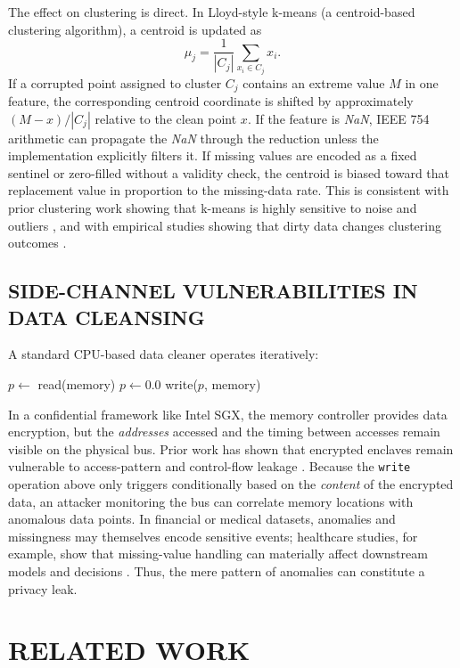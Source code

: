 \documentclass[conference]{IEEEtran}
\begin{document}
The effect on clustering is direct. In Lloyd-style k-means (a centroid-based clustering algorithm), a centroid is updated as
\begin{equation}
\mu_j = \frac{1}{|C_j|}\sum_{x_i \in C_j} x_i .
\end{equation}
If a corrupted point assigned to cluster $C_j$ contains an extreme value $M$ in one feature, the corresponding centroid coordinate is shifted by approximately $(M-x)/|C_j|$ relative to the clean point $x$. If the feature is \textit{NaN}, IEEE 754 arithmetic can propagate the \textit{NaN} through the reduction unless the implementation explicitly filters it. If missing values are encoded as a fixed sentinel or zero-filled without a validity check, the centroid is biased toward that replacement value in proportion to the missing-data rate. This is consistent with prior clustering work showing that k-means is highly sensitive to noise and outliers \cite{Chawla:2013,Im:2020}, and with empirical studies showing that dirty data changes clustering outcomes \cite{Qi:2021}.

\subsection{SIDE-CHANNEL VULNERABILITIES IN DATA CLEANSING}
A standard CPU-based data cleaner operates iteratively:
\begin{algorithmic}
\STATE $p \gets$ read(memory)
    \STATE $p \gets 0.0$
    \STATE write($p$, memory)
\ENDIF
\end{algorithmic}

In a confidential framework like Intel SGX, the memory controller provides data encryption, but the \textit{addresses} accessed and the timing between accesses remain visible on the physical bus. Prior work has shown that encrypted enclaves remain vulnerable to access-pattern and control-flow leakage \cite{Xu:2015,Gruss:2016,Lee:2017}. Because the \texttt{write} operation above only triggers conditionally based on the \textit{content} of the encrypted data, an attacker monitoring the bus can correlate memory locations with anomalous data points. In financial or medical datasets, anomalies and missingness may themselves encode sensitive events; healthcare studies, for example, show that missing-value handling can materially affect downstream models and decisions \cite{Chen:2023}. Thus, the mere pattern of anomalies can constitute a privacy leak.

\section{RELATED WORK}
\end{document}
